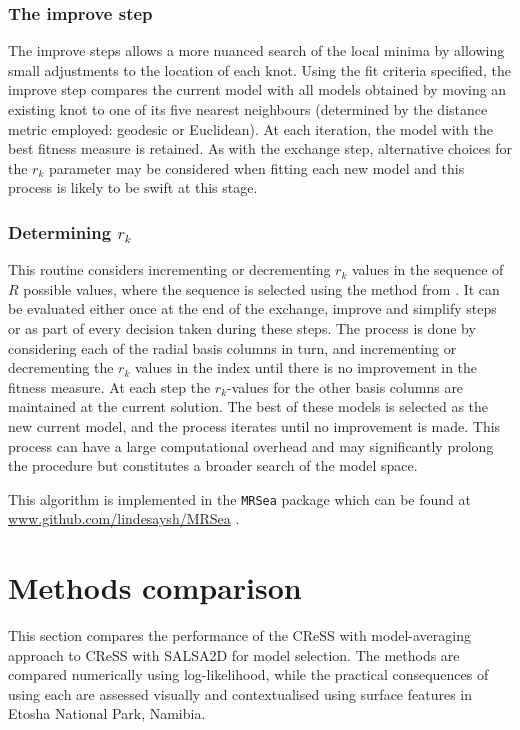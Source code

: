 \documentclass[letterpaper]{interact}
\begin{document}
\subsubsection{The improve step}\label{the-improve-step}

The improve steps allows a more nuanced search of the local minima by allowing small adjustments to the location of each knot. Using the fit criteria specified, the improve step compares the current model with all models obtained by moving an existing knot to one of its five nearest neighbours (determined by the distance metric employed: geodesic or Euclidean). At each iteration, the model with the best fitness measure is retained. As with the exchange step, alternative choices for the \(r_k\) parameter may be considered when fitting each new model and this process is likely to be swift at this stage.


\subsubsection{Determining $r_k$}
\label{determining-r_k}

This routine considers incrementing or decrementing \(r_k\) values in the sequence of \(R\) possible values, where the sequence is selected using the method from \citealp{scott2014}. It can be evaluated either once at the end of the exchange, improve and simplify steps or as part of every decision taken during these steps. The process is done by considering each of the radial basis columns in turn, and incrementing or decrementing the \(r_k\) values in the index until there is no improvement in the fitness measure. At each step the \(r_k\)-values for the other basis columns are maintained at the current solution. The best of these models is selected as the new current model, and the process iterates until no improvement is made. This process can have a large computational overhead and may significantly prolong the procedure but constitutes a broader search of the model space. 

This algorithm is implemented in the \texttt{MRSea} package which can be found at \url{www.github.com/lindesaysh/MRSea} \citep{scott2017}.


\section{Methods comparison}\label{methods-comparison}

This section compares the performance of the CReSS with model-averaging approach to CReSS with SALSA2D for model selection. The methods are compared numerically using log-likelihood, while the practical consequences of using each are assessed visually and contextualised using surface features in Etosha National Park, Namibia.
\end{document}
